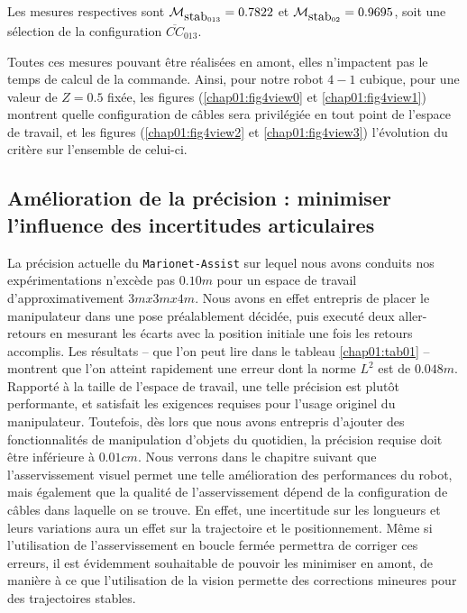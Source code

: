 Les mesures respectives sont $\mathcal M_{\hbox {stab}_{013}} = 0.7822$ et 
$\mathcal M_{\hbox {stab}_{02}} = 0.9695$, soit une sélection de la 
configuration $\overline{CC}_{013}$.

Toutes ces mesures pouvant être réalisées en amont, elles n'impactent pas le 
temps de calcul de la commande. Ainsi, pour notre robot $4-1$ cubique, pour une 
valeur de $Z = 0.5$ fixée, les figures (\ref{chap01:fig4view0} et
\ref{chap01:fig4view1}) montrent quelle configuration de câbles sera 
privilégiée en tout point de l'espace de travail, et  les figures 
(\ref{chap01:fig4view2} et \ref{chap01:fig4view3}) l'évolution du critère sur 
l'ensemble de celui-ci.

\subsection{Am\'elioration de la pr\'ecision : minimiser l'influence des 
incertitudes articulaires}

La pr\'ecision actuelle du {\tt Marionet-Assist} sur lequel nous avons 
conduits nos exp\'erimentations n'exc\`ede pas $0.10m$ pour 
un espace de travail d'approximativement $3mx3mx4m$. Nous avons en effet 
entrepris de placer le manipulateur dans une pose pr\'ealablement d\'ecid\'ee, 
puis execut\'e deux aller-retours en mesurant les \'ecarts avec la position 
initiale une fois les retours accomplis. Les r\'esultats -- que l'on peut lire 
dans le tableau \ref{chap01:tab01} -- montrent que l'on atteint rapidement une 
erreur dont la norme $L^2$ est de $0.048m$. Rapport\'e \`a la taille de 
l'espace de travail, une telle pr\'ecision est plut\^ot performante, et 
satisfait les exigences requises pour l'usage originel du manipulateur. 
Toutefois, d\`es lors que nous avons entrepris d'ajouter des fonctionnalit\'es 
de manipulation d'objets du quotidien, la pr\'ecision requise doit \^etre 
inf\'erieure \`a $0.01cm$. Nous verrons dans le chapitre suivant que 
l'asservissement visuel permet une telle am\'elioration des performances du 
robot, mais \'egalement que la qualit\'e de l'asservissement d\'epend de la 
configuration de c\^ables dans laquelle on se trouve. En effet, une incertitude 
sur les longueurs et leurs variations aura un effet sur la trajectoire et le 
positionnement. M\^eme si l'utilisation de l'asservissement en boucle 
ferm\'ee permettra de corriger ces erreurs, il est \'evidemment souhaitable de 
pouvoir les minimiser en amont, de mani\`ere \`a ce que l'utilisation de la 
vision permette des corrections mineures pour des trajectoires stables.  

